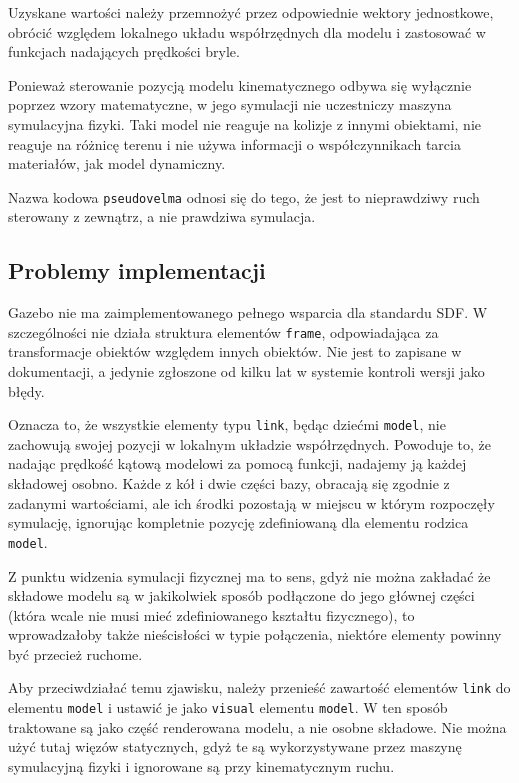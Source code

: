 	Uzyskane wartości należy przemnożyć przez odpowiednie wektory jednostkowe, obrócić względem lokalnego układu współrzędnych dla modelu i zastosować w funkcjach nadających prędkości bryle.

	Ponieważ sterowanie pozycją modelu kinematycznego odbywa się wyłącznie poprzez wzory matematyczne, w jego symulacji nie uczestniczy maszyna symulacyjna fizyki.
	Taki model nie reaguje na kolizje z innymi obiektami, nie reaguje na różnicę terenu i nie używa informacji o współczynnikach tarcia materiałów, jak model dynamiczny.

	Nazwa kodowa \texttt{pseudovelma} odnosi się do tego, że jest to nieprawdziwy ruch sterowany z zewnątrz, a nie prawdziwa symulacja.

	\subsection{Problemy implementacji}
		Gazebo nie ma zaimplementowanego pełnego wsparcia dla standardu SDF.
		W szczególności nie działa struktura elementów \texttt{frame}, odpowiadająca za transformacje obiektów względem innych obiektów.
		Nie jest to zapisane w dokumentacji, a jedynie zgłoszone od kilku lat w systemie kontroli wersji jako błędy.

		Oznacza to, że wszystkie elementy typu \texttt{link}, będąc dziećmi \texttt{model}, nie zachowują swojej pozycji w lokalnym układzie współrzędnych.
		Powoduje to, że nadając prędkość kątową modelowi za pomocą funkcji, nadajemy ją każdej składowej osobno.
		Każde z kół i dwie części bazy, obracają się zgodnie z zadanymi wartościami, ale ich środki pozostają w miejscu w którym rozpoczęły symulację,
		ignorując kompletnie pozycję zdefiniowaną dla elementu rodzica \texttt{model}.
		
		Z punktu widzenia symulacji fizycznej ma to sens, gdyż nie można zakładać że składowe modelu są w jakikolwiek sposób podłączone do jego głównej części
		(która wcale nie musi mieć zdefiniowanego kształtu fizycznego), to wprowadzałoby także nieścisłości w typie połączenia, niektóre elementy powinny być przecież ruchome.

		Aby przeciwdziałać temu zjawisku, należy przenieść zawartość elementów \texttt{link} do elementu \texttt{model} i ustawić je jako \texttt{visual} elementu \texttt{model}.
		W ten sposób traktowane są jako część renderowana modelu, a nie osobne składowe.
		Nie można użyć tutaj więzów statycznych, gdyż te są wykorzystywane przez maszynę symulacyjną fizyki i ignorowane są przy kinematycznym ruchu.

